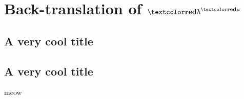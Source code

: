 \documentclass{article}
\begin{document}
\begin{smathpar}

  \sx

  \se

  \sv

  \svtwo

  \salpha

  \stypr[4]

  \sfunty{\styone}{\stytwo}

  \sfune{\sx}{\sty}{\seone}

  \sboolty

  \tfune{\tx}{\ttyone}{\teone}



  \acasee{\ae}{\ax}{\aeone}{\ay}{\aetwo}

\end{smathpar}

\renewcommand{\tlang}{\tfont{\uplambda}^{\tfont{\mu}}}
\section{Back-translation of $\tlang$}
\subsection{A very cool title}
\subsection{A very cool title}


meow
\end{document}
